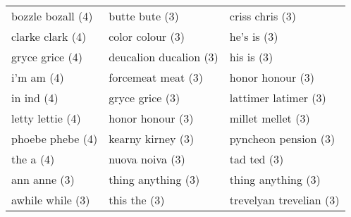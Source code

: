 \documentclass{article}
\begin{document}
\begin{table}
\begin{tabular}{l|l|l}
 bozzle  bozall (4) & butte  bute (3) & criss  chris (3) \\
 clarke  clark (4) & color  colour (3) & he's  is (3) \\
 gryce  grice (4) & deucalion  ducalion (3) & his  is (3) \\
 i'm  am (4) & forcemeat  meat (3) & honor  honour (3) \\
 in  ind (4) & gryce  grice (3) & lattimer  latimer (3) \\
 letty  lettie (4) & honor  honour (3) & millet  mellet (3) \\
 phoebe  phebe (4) & kearny  kirney (3) & pyncheon  pension (3) \\
 the  a (4) & nuova  noiva (3) & tad  ted (3) \\
 ann  anne (3) & thing  anything (3) & thing  anything (3) \\
 awhile  while (3) & this  the (3) & trevelyan  trevelian (3) \\
\bottomrule
\end{tabular}
\end{table}
\end{document}
